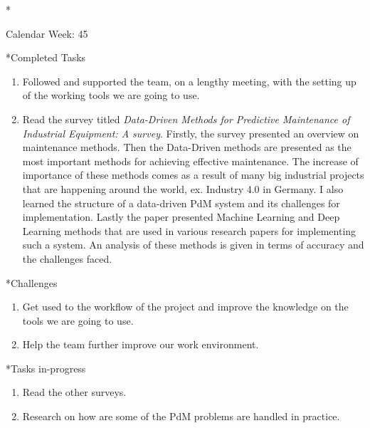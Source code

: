 \documentclass[11pt,a4paper]{article}
\begin{document}
\begin{section}*{Calendar Week: 45 \hfill \date{06 November, 2020}}
 \begin{refsection}

       \begin{subsection}*{Completed Tasks}
             \begin{enumerate}
                   \item
                         Followed and supported the team, on a lengthy meeting, with the setting up of the working
                         tools we are going to use.
                   \item
                         Read the survey titled \emph{Data-Driven Methods for Predictive Maintenance of Industrial
                               Equipment: A survey}. Firstly, the survey presented an overview on maintenance methods. Then
                         the Data-Driven methods are presented as the most important methods for achieving effective
                         maintenance. The increase of importance of these methods comes as a result of many big
                         industrial projects that are happening around the world, ex. Industry 4.0 in Germany.
                         I also learned the structure of a data-driven PdM system and its challenges for
                         implementation. Lastly the paper presented Machine Learning and Deep Learning
                         methods that are used in various research papers for implementing such a system.
                         An analysis of these methods is given in terms of accuracy and the challenges faced.
                         \cite{DBLP:journals/sj/ZhangYW19}
             \end{enumerate}
       \end{subsection}

       \begin{subsection}*{Challenges}
             \begin{enumerate}
                   \item
                         Get used to the workflow of the project and improve the knowledge on the tools we are going
                         to use.
                   \item
                         Help the team further improve our work environment.
             \end{enumerate}
       \end{subsection}

       \begin{subsection}*{Tasks in-progress}
             \begin{enumerate}
                   \item
                         Read the other surveys.
                   \item
                         Research on how are some of the PdM problems are handled in practice.
             \end{enumerate}
       \end{subsection}

       \printbibliography
 \end{refsection}
\end{section}
\end{document}
